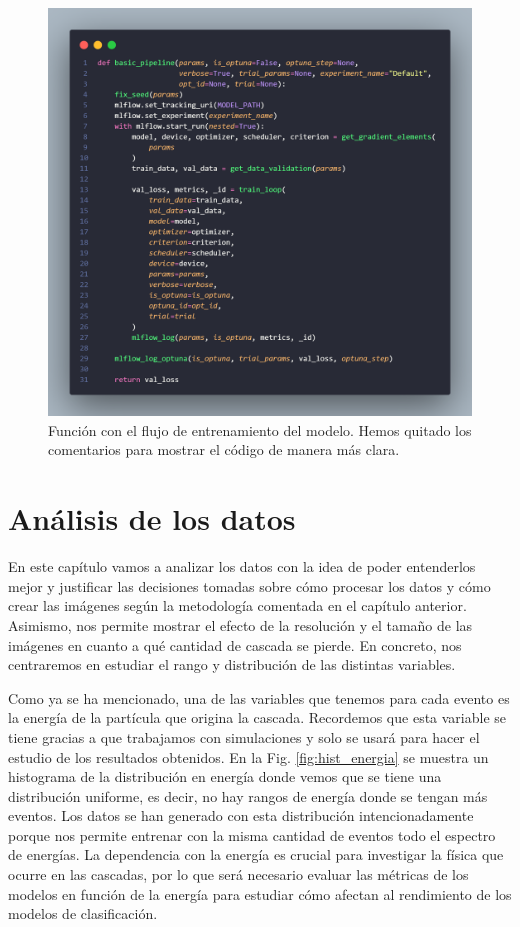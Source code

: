 \documentclass[a4paper,12pt,oneside,titlepage]{book}
\begin{document}
\begin{figure}[h!]
  \centering
  \includegraphics[scale=0.3]{basic_pipe.png}
  \caption{Función con el flujo de entrenamiento del modelo. Hemos quitado los comentarios para mostrar el código de manera más clara.}
  \label{fig:flujo_code}
\end{figure}

\newpage
\chapter{Análisis de los datos}
\label{cap:4}

En este capítulo vamos a analizar los datos con la idea de poder entenderlos mejor y justificar las decisiones tomadas sobre cómo procesar los datos y cómo crear las imágenes según la metodología comentada en el capítulo anterior. Asimismo, nos permite mostrar el efecto de la resolución y el tamaño de las imágenes en cuanto a qué cantidad de cascada se pierde. En concreto, nos centraremos en estudiar el rango y distribución de las distintas variables.

Como ya se ha mencionado, una de las variables que tenemos para cada evento es la energía de la partícula que origina la cascada. Recordemos que esta variable se tiene gracias a que trabajamos con simulaciones y solo se usará para hacer el estudio de los resultados obtenidos. En la Fig. \ref{fig:hist_energia} se muestra un histograma de la distribución en energía donde vemos que se tiene una distribución uniforme, es decir, no hay rangos de energía donde se tengan más eventos. Los datos se han generado con esta distribución intencionadamente porque nos permite entrenar con la misma cantidad de eventos todo el espectro de energías. La dependencia con la energía es crucial para investigar la física que ocurre en las cascadas, por lo que será necesario evaluar las métricas de los modelos en función de la energía para estudiar cómo afectan al rendimiento de los modelos de clasificación.
\end{document}
